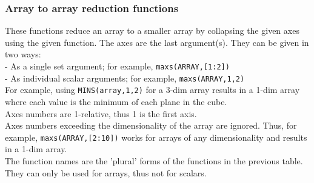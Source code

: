\subsubsection{Array to array reduction functions}
These functions reduce an array to a smaller array by collapsing
the given axes using the given function. The axes are the last argument(s).
They can be given in two ways:
\\- As a single set argument; for example, \texttt{maxs(ARRAY,[1:2])}
\\- As individual scalar arguments; for example, \texttt{maxs(ARRAY,1,2)}
\\For example, using
\texttt{MINS(array,1,2)} for a 3-dim array results in a 1-dim array
where each value is the minimum of each plane in the cube.
\\Axes numbers are 1-relative, thus 1 is the first axis.
\\Axes numbers exceeding the dimensionality of the array are ignored.
Thus, for example, \texttt{maxs(ARRAY,[2:10])} works for arrays
of any dimensionality and results in a 1-dim array.
\\The function names are the 'plural' forms of the
functions in the previous table.
They can only be used for arrays, thus not for scalars.
